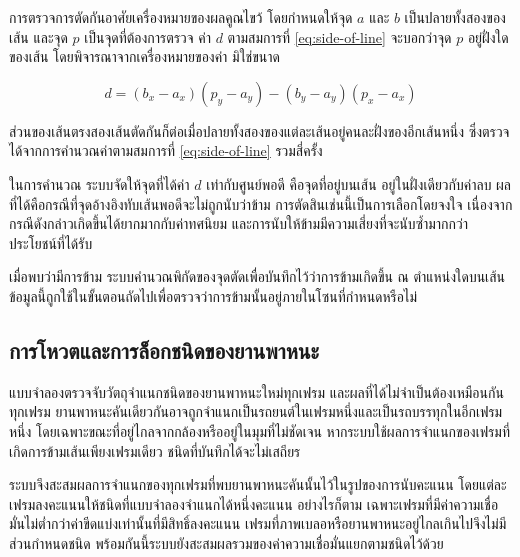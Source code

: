 การตรวจการตัดกันอาศัยเครื่องหมายของผลคูณไขว้ โดยกำหนดให้จุด $a$ และ $b$ เป็นปลายทั้งสองของเส้น และจุด $p$ เป็นจุดที่ต้องการตรวจ ค่า $d$ ตามสมการที่ \ref{eq:side-of-line} จะบอกว่าจุด $p$ อยู่ฝั่งใดของเส้น โดยพิจารณาจากเครื่องหมายของค่า มิใช่ขนาด

\begin{equation}
    d = (b_x - a_x)(p_y - a_y) - (b_y - a_y)(p_x - a_x)
    \label{eq:side-of-line}
\end{equation}

ส่วนของเส้นตรงสองเส้นตัดกันก็ต่อเมื่อปลายทั้งสองของแต่ละเส้นอยู่คนละฝั่งของอีกเส้นหนึ่ง ซึ่งตรวจได้จากการคำนวณค่าตามสมการที่ \ref{eq:side-of-line} รวมสี่ครั้ง

ในการคำนวณ ระบบจัดให้จุดที่ได้ค่า $d$ เท่ากับศูนย์พอดี คือจุดที่อยู่บนเส้น อยู่ในฝั่งเดียวกับค่าลบ ผลที่ได้คือกรณีที่จุดอ้างอิงทับเส้นพอดีจะไม่ถูกนับว่าข้าม  การตัดสินเช่นนี้เป็นการเลือกโดยจงใจ เนื่องจากกรณีดังกล่าวเกิดขึ้นได้ยากมากกับค่าทศนิยม และการนับให้ข้ามมีความเสี่ยงที่จะนับซ้ำมากกว่าประโยชน์ที่ได้รับ

เมื่อพบว่ามีการข้าม ระบบคำนวณพิกัดของจุดตัดเพื่อบันทึกไว้ว่าการข้ามเกิดขึ้น ณ ตำแหน่งใดบนเส้น ข้อมูลนี้ถูกใช้ในขั้นตอนถัดไปเพื่อตรวจว่าการข้ามนั้นอยู่ภายในโซนที่กำหนดหรือไม่


\subsection{การโหวตและการล็อกชนิดของยานพาหนะ}
\label{subsec:type-voting}

แบบจำลองตรวจจับวัตถุจำแนกชนิดของยานพาหนะใหม่ทุกเฟรม และผลที่ได้ไม่จำเป็นต้องเหมือนกันทุกเฟรม ยานพาหนะคันเดียวกันอาจถูกจำแนกเป็นรถยนต์ในเฟรมหนึ่งและเป็นรถบรรทุกในอีกเฟรมหนึ่ง โดยเฉพาะขณะที่อยู่ไกลจากกล้องหรืออยู่ในมุมที่ไม่ชัดเจน  หากระบบใช้ผลการจำแนกของเฟรมที่เกิดการข้ามเส้นเพียงเฟรมเดียว ชนิดที่บันทึกได้จะไม่เสถียร

ระบบจึงสะสมผลการจำแนกของทุกเฟรมที่พบยานพาหนะคันนั้นไว้ในรูปของการนับคะแนน โดยแต่ละเฟรมลงคะแนนให้ชนิดที่แบบจำลองจำแนกได้หนึ่งคะแนน  อย่างไรก็ตาม เฉพาะเฟรมที่มีค่าความเชื่อมั่นไม่ต่ำกว่าค่าขีดแบ่งเท่านั้นที่มีสิทธิ์ลงคะแนน เฟรมที่ภาพเบลอหรือยานพาหนะอยู่ไกลเกินไปจึงไม่มีส่วนกำหนดชนิด พร้อมกันนี้ระบบยังสะสมผลรวมของค่าความเชื่อมั่นแยกตามชนิดไว้ด้วย

